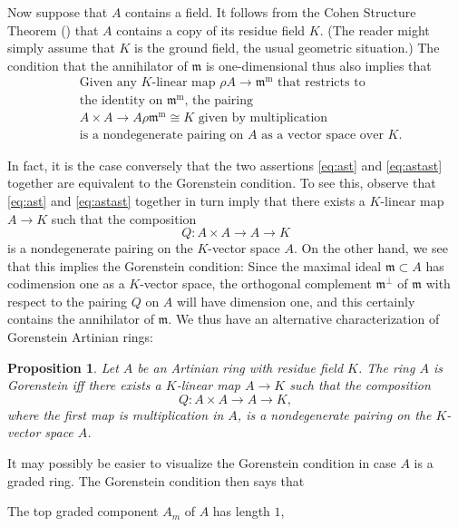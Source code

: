 \documentclass{bull-l}
\newcommand{\MM}{\operatorname{m}}
\newtheorem{prop}{Proposition}
\theoremstyle{pplain}
\theoremstyle{definition}
\begin{document}
Now suppose that $A$ contains a field.  It follows from the Cohen Structure 
Theorem (\cite[Theorem 7.7]{E}) that $A$ contains a copy of its residue field
$K$.  (The reader might simply assume that $K$ is the ground field, the usual
geometric situation.)  
The condition that the annihilator of
$\mathfrak{m}$ is one-dimensional thus also implies that
\begin{equation} \label{eq:astast}
\begin{split}
&\text{Given any $K$-linear map $\rho A\to \mathfrak{m}^{\MM}$ that restricts to}\\
&\text {the identity on $\mathfrak{m}^{\MM}$, the pairing }\\
&\text{$A\times A\to A\rho \mathfrak{m}^{\MM}\cong K$ 
given by multiplication}\\
&\text{is 
a nondegenerate pairing on $A$ as  a vector
space over $K$.}
\end{split} \tag {$**$}
\end{equation}

In fact, it is the case conversely that the two assertions \eqref{eq:ast}
and \eqref{eq:astast} together are equivalent to the Gorenstein condition.  To
see this, observe that \eqref{eq:ast} and \eqref{eq:astast} together in turn
imply that there exists a $K$-linear map $A\to K$ such that the composition
\[Q:A\times A\to A\to K\]
is a nondegenerate pairing on the $K$-vector space $A$. On the other hand, we
see that this implies the Gorenstein condition: Since the maximal ideal 
$\mathfrak{m} \subset A$ has codimension one as a $K$-vector space, the 
orthogonal complement $\mathfrak{m}^\perp$ of $\mathfrak{m}$ with respect to
the pairing $Q$ on $A$ will have dimension one, and this certainly contains the
annihilator of $\mathfrak{m}$.  We thus have an alternative characterization of
Gorenstein Artinian rings:

\begin{prop}\label{prop:seven}
Let $A$ be an Artinian ring with residue field $K$.  The ring $A$ is Gorenstein
iff there exists a $K$-linear map $A\to K$ such that the composition
\[Q:A\times A\to A\to K,\]
where the first map is multiplication in $A$, is a nondegenerate pairing on the
$K$-vector space $A$.
\end{prop}

It may possibly be easier to visualize the Gorenstein condition in case $A$ is
a graded ring.  The Gorenstein condition then says that 

The top graded component $A_m$ of $A$ has length $1$,
\end{document}
